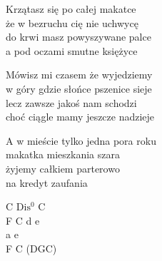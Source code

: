 \begin{text}
    Krzątasz się po całej makatce\\
    że w bezruchu cię nie uchwycę\\
    do krwi masz powyszywane palce\\
    a pod oczami smutne księżyce

    Mówisz mi czasem że wyjedziemy\\
    w góry gdzie słońce pszenice sieje\\
    lecz zawsze jakoś nam schodzi\\
    choć ciągle mamy jeszcze nadzieje

    A w mieście tylko jedna pora roku\\
    makatka mieszkania szara\\
    żyjemy całkiem parterowo\\
    na kredyt zaufania
\end{text}
\begin{chord}
    C $\mathrm{Dis^{0}}$ C\\
    F C d e\\
    a e\\
    F C (DGC)

\end{chord}
